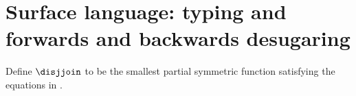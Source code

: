 \section{Surface language: typing and forwards and backwards desugaring}
\label{app:surface-language}





\begin{definition}
   Define $\disjjoin$ to be the smallest partial symmetric function satisfying the equations in .
\end{definition}








